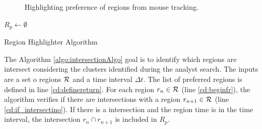 \documentclass[runningheads,a4paper]{llncs}
\begin{document}
\begin{figure}
  \\ %
  \\ %
  \caption{Highlighting preference of regions from mouse tracking. }
  \label{fig:paris}
\end{figure} %


\begin{algorithm}[t]
	\DontPrintSemicolon
	${ R_p} \gets \emptyset$\;\label{cd:definereturn}
	\; 
	\caption{{\sc Region Highlighter} Algorithm}
	\label{algo:intersectionAlgo}
\end{algorithm}

The Algorithm \ref{algo:intersectionAlgo} goal is to identify which regions are intersect considering the clusters identified during  the analyst search. The inputs are a set o regions ${\cal R}$  and a time interval $\Delta t$. The list of preferred regions is defined in line \ref{cd:definereturn}. For each region $r_n \in {\cal R}$ (line \ref{cd:beginfr}), the algorithm verifies if there are intersections with  a region $r_{n+1} \in {\cal R}$ (line \ref{cd:if_intersectino}). If there is a intersection and the region time is in the time interval, the intersection $r_n \cap r_{n+1} $ is included in ${ R_p}$.
\end{document}
